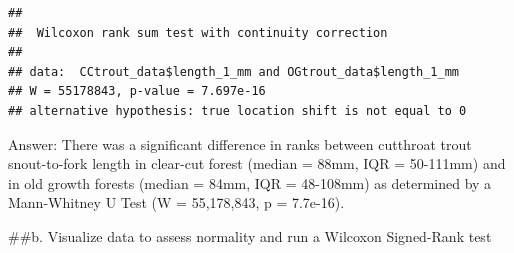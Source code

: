 \documentclass[
]{article}
\newenvironment{Shaded}{\begin{snugshade}}{\end{snugshade}}
\newcommand{\AttributeTok}[1]{\textcolor[rgb]{0.13,0.29,0.53}{#1}}
\newcommand{\CommentTok}[1]{\textcolor[rgb]{0.56,0.35,0.01}{\textit{#1}}}
\newcommand{\ConstantTok}[1]{\textcolor[rgb]{0.56,0.35,0.01}{#1}}
\newcommand{\FunctionTok}[1]{\textcolor[rgb]{0.13,0.29,0.53}{\textbf{#1}}}
\newcommand{\NormalTok}[1]{#1}
\newcommand{\OtherTok}[1]{\textcolor[rgb]{0.56,0.35,0.01}{#1}}
\newcommand{\SpecialCharTok}[1]{\textcolor[rgb]{0.81,0.36,0.00}{\textbf{#1}}}
\newcommand{\StringTok}[1]{\textcolor[rgb]{0.31,0.60,0.02}{#1}}
\begin{document}
\begin{Shaded}
\end{Shaded}

\begin{verbatim}
## 
##  Wilcoxon rank sum test with continuity correction
## 
## data:  CCtrout_data$length_1_mm and OGtrout_data$length_1_mm
## W = 55178843, p-value = 7.697e-16
## alternative hypothesis: true location shift is not equal to 0
\end{verbatim}

Answer: There was a significant difference in ranks between cutthroat
trout snout-to-fork length in clear-cut forest (median = 88mm, IQR =
50-111mm) and in old growth forests (median = 84mm, IQR = 48-108mm) as
determined by a Mann-Whitney U Test (W = 55,178,843, p = 7.7e-16).

\#\#b. Visualize data to assess normality and run a Wilcoxon Signed-Rank
test
\end{document}
